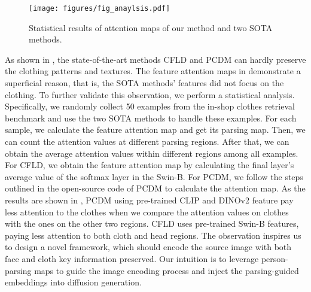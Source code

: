 %
\begin{figure}{}{}
    \texttt{[image: figures/fig\_anaylsis.pdf]}
    \caption{{Statistical results of attention maps of our method and two SOTA methods.}
    \label{fig:limitation}
    }
\end{figure}
%
As shown in , the state-of-the-art methods CFLD \cite{lu2024coarse} and PCDM \cite{shen2024advancing} can hardly preserve the clothing patterns and textures.
%
The feature attention maps in  demonstrate a superficial reason, that is, the SOTA methods' features did not focus on the clothing. 
%
To further validate this observation, we perform a statistical analysis.
%
Specifically, we randomly collect 50 examples from the in-shop clothes retrieval benchmark \cite{liuLQWTcvpr16DeepFashion} and use the two SOTA methods to handle these examples.
%
For each sample, we calculate the feature attention map and get its parsing map.
%
Then, we can count the attention values at different parsing regions.
%
After that, we can obtain the average attention values within different regions among all examples.
%
For CFLD, we obtain the feature attention map by calculating the final layer's average value of the softmax layer in the Swin-B. 
%
For PCDM, we follow the steps outlined in the open-source code of PCDM to calculate the attention map.
%
As the results are shown in , PCDM using pre-trained CLIP and DINOv2 feature pay less attention to the clothes when we compare the attention values on clothes with the ones on the other two regions.
%
CFLD uses pre-trained Swin-B features, paying less attention to both cloth and head regions.
%
The observation inspires us to design a novel framework, which should encode the source image with both face and cloth key information preserved.
%
Our intuition is to leverage person-parsing maps to guide the image encoding process and inject the parsing-guided embeddings into diffusion generation.